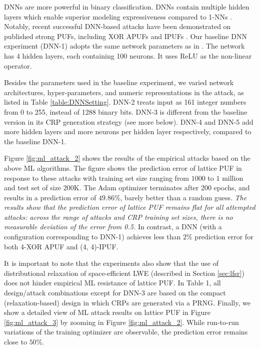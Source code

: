 DNNs are more powerful in binary classification. DNNs contain multiple hidden layers which enable superior modeling expressiveness compared to 1-NNs \cite{goodfellow2016deep}. Notably, recent successful DNN-based attacks have been demonstrated on published strong PUFs, including XOR APUFs and IPUFs \cite{DBLP:journals/iacr/SantikellurBC19}. Our baseline DNN experiment (DNN-1) adopts the same network parameters as in \cite{DBLP:journals/iacr/SantikellurBC19}.  The network has 4 hidden layers, each containing 100 neurons. It uses ReLU as the non-linear operator. 

Besides the parameters used in the baseline experiment, we varied network architectures, hyper-parameters, and numeric representations in the attack, as listed in Table \ref{table:DNNSetting}. 
DNN-2 treats input as 161 integer numbers from 0 to 255, instead of 1288 binary bits.
DNN-3 is different from the baseline version in its CRP generation strategy (see more below).
DNN-4 and DNN-5 add more hidden layers and more neurons per hidden layer respectively, compared to the baseline DNN-1.

Figure \ref{fig:ml_attack_2} shows the results of the empirical attacks based on the above ML algorithms. The figure shows the prediction error of lattice PUF in response to these attacks with training set size ranging from $1000$ to $1$ million and test set of size $200$K. The Adam optimizer \cite{kingma2014adam} terminates after 200 epochs, and results in a prediction error of $49.86\%$, barely better than a random guess. \emph{The results show that the prediction error of lattice PUF remains flat for all attempted attacks: across the range of attacks and CRP training set sizes, there is no measurable deviation of the error from 0.5.} In contrast, a DNN (with a configuration corresponding to DNN-1) achieves less than $2\%$ prediction error for both 4-XOR APUF and (4, 4)-IPUF. 

It is important to note that the experiments also show that the use of distributional relaxation of space-efficient LWE (described in Section \ref{sec:lfsr}) does not hinder empirical ML resistance of lattice PUF. In Table 1, all design/attack combinations except for DNN-3 are based on the compact (relaxation-based) design in which CRPs are generated via a PRNG. Finally, we show a detailed view of ML attack results on lattice PUF in Figure \ref{fig:ml_attack_3} by zooming in Figure \ref{fig:ml_attack_2}. While run-to-run variations of the training optimizer are observable, the prediction error remains close to $50\%$.

